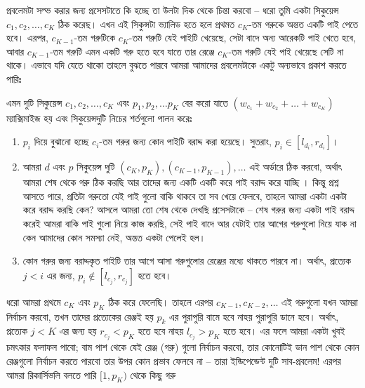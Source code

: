 \begin{solution}
  প্রবলেমটা সল্ভ করার জন্য প্রসেসটাতে কি হচ্ছে তা উলটা দিক থেকে চিন্তা করবো
  -- ধরো তুমি একটা সিকুয়েন্স $c_1, c_2, \ldots, c_K$ ঠিক করেছ। এখন এই
  সিকুন্সটা ভ্যালিড হতে হলে প্রথমত $c_K$-তম গরুকে অন্তত একটি পাই পেতে হবে।
  এরপর, $c_{K-1}$-তম গরুটিকে $c_K$-তম গরুটি যেই পাইটি খেয়েছে, সেটা বাদে অন্য
  আরেকটি পাই খেতে হবে, আবার $c_{K-1}$-তম গরুটি এমন একটি গরু হতে হবে যাতে তার
  রেঞ্জে $c_K$-তম গরুটি যেই পাই খেয়েছে সেটি না থাকে। এভাবে যদি যেতে থাকো
  তাহলে বুঝতে পারবে আমরা আমাদের প্রবলেমটাকে একটু অন্যভাবে প্রকাশ করতে পারিঃ
  \begin{reducedproblem}
    এমন দুটি সিকুয়েন্স $c_1, c_2, \ldots, c_K$ এবং $p_1, p_2, \ldots
    p_K$ বের করো যাতে $(w_{c_1} + w_{c_2} + \ldots + w_{c_K})$ ম্যাক্সিমাইজ
    হয় এবং সিকুয়েন্সদুটি নিচের শর্তগুলো পালন
    করেঃ
    \begin{enumerate}
      \item $p_i$ দিয়ে বুঝানো হচ্ছে $c_i$-তম গরুর জন্য কোন পাইটি বরাদ্দ করা
      হয়েছে। সুতরাং, $p_i \in [l_{d_i}, r_{d_i}]$।
      \item আমরা $d$ এবং $p$ সিকুয়েন্স
      দুটি $(c_K, p_K), (c_{K-1}, p_{K-1}), \ldots$ এই অর্ডারে ঠিক করবো,
      অর্থাৎ আমরা
      শেষ থেকে গরু ঠিক করছি আর তাদের জন্য একটি একটি করে পাই বরাদ্দ করে যাচ্ছি
      । কিন্তু প্রশ্ন আসতে পারে, প্রতিটা গরুতো যেই পাই গুলো বাকি থাকবে তা সব
      খেয়ে ফেলবে, তাহলে আমরা একটা একটা করে বরাদ্দ করছি কেন? আসলে আমরা তো শেষ
      থেকে দেখছি প্রসেসটাকে -- শেষ গরুর জন্য একটা পাই বরাদ্দ করেই আমরা বাকি
      পাই গুলো নিয়ে কাজ করছি, সেই পাই বাদে আর যেটাই তার আগের গরুগুলো নিয়ে যাক
      না কেন আমাদের কোন সমস্যা নেই, অন্তত একটা পেলেই হল।
      \item কোন গরুর জন্য বরাদ্দকৃত পাইটি তার আগে আসা গরুগুলোর রেঞ্জের মধ্যে
      থাকতে পারবে না। অর্থাৎ, প্রত্যেক $j < i$ এর জন্য, $p_i \notin [l_{c_j},
      r_{c_j}]$ হতে হবে।
    \end{enumerate}
  \end{reducedproblem}
  ধরো আমরা প্রথমে $c_K$ এবং $p_K$ ঠিক করে ফেলেছি। তাহলে এরপর $c_{K-1},
  c_{K-2}, \ldots$ এই গরুগুলো যখন আমরা নির্বাচন করবো, তখন তাদের প্রত্যেকের
  রেঞ্জই হয় $p_k$ এর পুরাপুরি বামে হবে নাহয় পুরাপুরি ডানে হবে। অর্থাৎ,
  প্রত্যেক $j < K$ এর জন্য হয় $r_{c_j} < p_K$ হতে হবে নাহয় $l_{c_j} > p_K$
  হতে হবে। এর ফলে আমরা একটা খুবই চমৎকার ফলাফল পাবো; বাম পাশ থেকে যেই রেঞ্জ
  (গরু) গুলো নির্বাচন করবো, তার কোনোটিই ডান পাশ থেকে কোন রেঞ্জগুলো নির্বাচন
  করতে পারবো তার উপর কোন প্রভাব ফেলবে না -- তারা ইন্ডিপেন্ডেন্ট দুটি
  সাব-প্রবলেম! এরপর আমরা রিকার্সিভলি বলতে পারি $[1, p_K)$ থেকে কিছু গরু

\end{solution}
